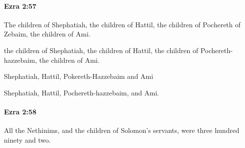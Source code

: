 		\paragraph{Ezra 2:57} %
			\label{EZRA-2-57}

			The children of Shephatiah, the children of Hattil, the children of Pochereth of Zebaim, the children of Ami.

			\begin{versebox}
					\item[BHS] 
					\item[LXX] 
					\item[ASV] the children of Shephatiah, the children of Hattil, the children of Pochereth-hazzebaim, the children of Ami.
					\item[NIV] Shephatiah, Hattil, Pokereth-Hazzebaim and Ami
					\item[NRSV] Shephatiah, Hattil, Pochereth-hazzebaim, and Ami.
			\end{versebox}

		\paragraph{Ezra 2:58} %
			\label{EZRA-2-58}

			All the Nethinims, and the children of Solomon’s servants, were three hundred ninety and two.

